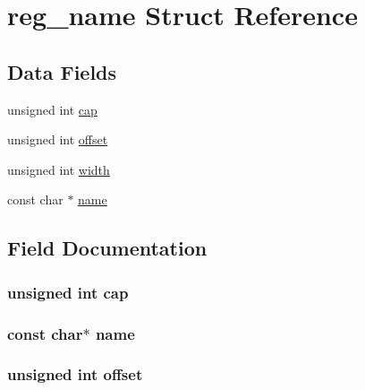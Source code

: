 \hypertarget{structreg__name}{}\section{reg\+\_\+name Struct Reference}
\label{structreg__name}
\subsection*{Data Fields}
\begin{DoxyCompactItemize}
\item 
unsigned int \hyperlink{structreg__name_a488a46fc5433f62e2e608f9c5091ce6b}{cap}
\item 
unsigned int \hyperlink{structreg__name_a29b5297d3393519050e3126c4cb07c1c}{offset}
\item 
unsigned int \hyperlink{structreg__name_aca34d28e3d8bcbcadb8edb4e3af24f8c}{width}
\item 
const char $\ast$ \hyperlink{structreg__name_a8f8f80d37794cde9472343e4487ba3eb}{name}
\end{DoxyCompactItemize}


\subsection{Field Documentation}
\subsubsection[{\texorpdfstring{cap}{cap}}]{\setlength{\rightskip}{0pt plus 5cm}unsigned int cap}\hypertarget{structreg__name_a488a46fc5433f62e2e608f9c5091ce6b}{}\label{structreg__name_a488a46fc5433f62e2e608f9c5091ce6b}
\subsubsection[{\texorpdfstring{name}{name}}]{\setlength{\rightskip}{0pt plus 5cm}const char$\ast$ name}\hypertarget{structreg__name_a8f8f80d37794cde9472343e4487ba3eb}{}\label{structreg__name_a8f8f80d37794cde9472343e4487ba3eb}
\subsubsection[{\texorpdfstring{offset}{offset}}]{\setlength{\rightskip}{0pt plus 5cm}unsigned int offset}\hypertarget{structreg__name_a29b5297d3393519050e3126c4cb07c1c}{}\label{structreg__name_a29b5297d3393519050e3126c4cb07c1c}
